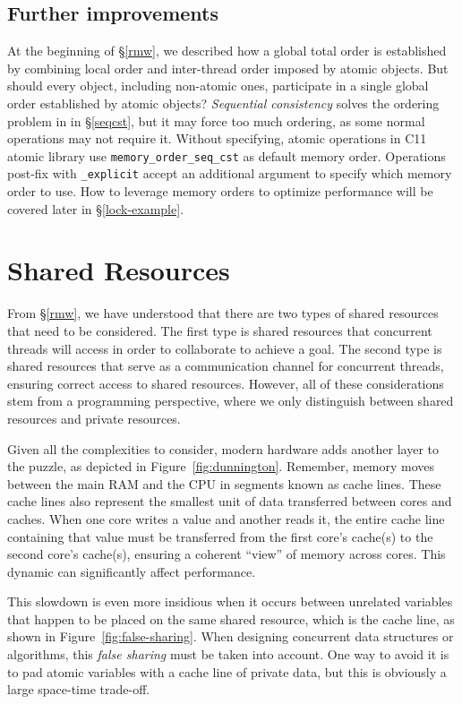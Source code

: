 \documentclass[fontsize=10pt, oneside]{scrartcl}
\newcommand{\monobox}[1]{\mbox{\texttt{#1}}}
\newcommand{\clang}[1]{C}
\newcommand{\fig}[1]{Figure~\ref{#1}}
\newcommand{\introduce}[1]{\textit{#1}}
\newcommand{\secref}[1]{\hyperref[#1]{\textsc{\S}\ref*{#1}}}
\begin{document}
\subsection{Further improvements}
At the beginning of \secref{rmw}, we described how a global total order is established by combining local order and inter-thread order imposed by atomic objects. 
But should every object, including non-atomic ones, participate in a single global order established by atomic objects?
\introduce{Sequential consistency} solves the ordering problem in in \secref{seqcst}, but it may force too much ordering, as some normal operations may not require it.
Without specifying, atomic operations in \clang{}11 atomic library use \monobox{memory\_order\_seq\_cst} as default memory order. Operations post-fix with \monobox{\_explicit} accept an additional argument to specify which memory order to use.
How to leverage memory orders to optimize performance will be covered later in \secref{lock-example}.

\section{Shared Resources}
\label{shared-resources}
From \secref{rmw}, we have understood that there are two types of shared resources that need to be considered. 
The first type is shared resources that concurrent threads will access in order to collaborate to achieve a goal. 
The second type is shared resources that serve as a communication channel for concurrent threads, 
ensuring correct access to shared resources. 
However, all of these considerations stem from a programming perspective, 
where we only distinguish between shared resources and private resources. 

Given all the complexities to consider, modern hardware adds another layer to the puzzle, 
as depicted in \fig{fig:dunnington}. 
Remember, memory moves between the main \textsc{RAM} and the \textsc{CPU} in segments known as cache lines. 
These cache lines also represent the smallest unit of data transferred between cores and caches. 
When one core writes a value and another reads it, 
the entire cache line containing that value must be transferred from the first core's cache(s) to the second core's cache(s), 
ensuring a coherent ``view'' of memory across cores. This dynamic can significantly affect performance.

This slowdown is even more insidious when it occurs between unrelated variables that happen to be placed on the same shared resource, 
which is the cache line, as shown in \fig{fig:false-sharing}. 
When designing concurrent data structures or algorithms, 
this \introduce{false sharing} must be taken into account. 
One way to avoid it is to pad atomic variables with a cache line of private data, 
but this is obviously a large space-time trade-off.
\end{document}
